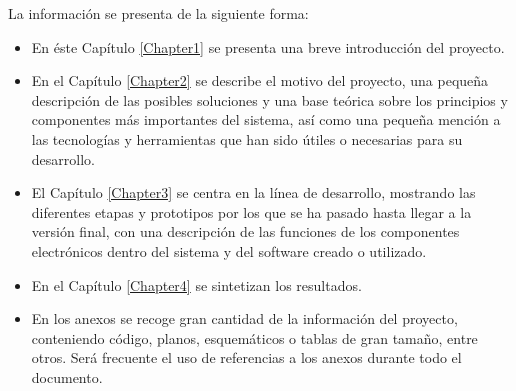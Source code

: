 La información se presenta de la siguiente forma:

\begin{itemize}
  \item En éste Capítulo \ref{Chapter1} se presenta una breve introducción del proyecto.
  \item En el Capítulo \ref{Chapter2} se describe el motivo del proyecto, una pequeña descripción de las posibles soluciones y una base teórica sobre los principios y componentes más importantes del sistema, así como una pequeña mención a las tecnologías y herramientas que han sido útiles o necesarias para su desarrollo.
  \item El Capítulo \ref{Chapter3} se centra en la línea de desarrollo, mostrando las diferentes etapas y prototipos por los que se ha pasado hasta llegar a la versión final, con una descripción de las funciones de los componentes electrónicos dentro del sistema y del software creado o utilizado.
  \item En el Capítulo \ref{Chapter4} se sintetizan los resultados.
  \item En los anexos se recoge gran cantidad de la información del proyecto, conteniendo código, planos, esquemáticos o tablas de gran tamaño, entre otros. Será frecuente el uso de referencias a los anexos durante todo el documento.
\end{itemize}
